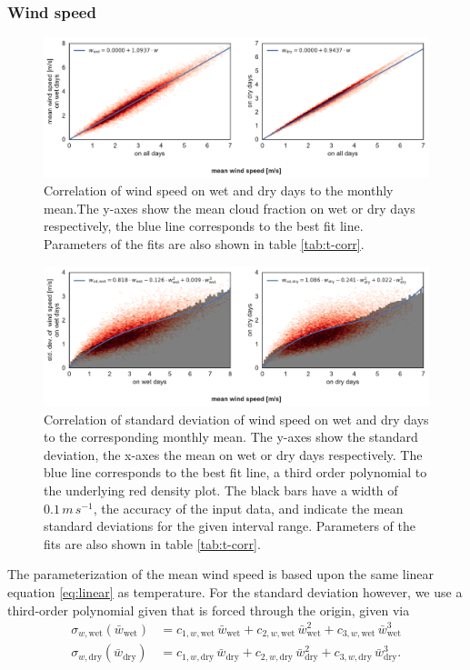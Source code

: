 \begin{refsection}
\subsubsection{Wind speed}
\begin{figure}
	\includegraphics[width=12cm]{gwgen-figures/f10.pdf}
	\caption[Correlation of wind speed on wet and dry days to the monthly mean]{Correlation of wind speed on wet and dry days to the monthly mean.The y-axes show the mean cloud fraction on wet or dry days respectively, the blue line corresponds to the best fit line. Parameters of the fits are also shown in table \ref{tab:t-corr}.}
	\label{fig:wind}
\end{figure}
\begin{figure}
	\includegraphics[width=12cm]{gwgen-figures/f11.pdf}
	\caption[Correlation of standard deviation of wind speed to the monthly mean]{Correlation of standard deviation of wind speed on wet and dry days to the corresponding monthly mean. The y-axes show the standard deviation, the x-axes the mean on wet or dry days respectively. The blue line corresponds to the best fit line, a third order polynomial to the underlying red density plot. The black bars have a width of $0.1\, \unit{m}\, \unit{s}^{-1}$, the accuracy of the input data, and indicate the mean standard deviations for the given interval range. Parameters of the fits are also shown in table \ref{tab:t-corr}.}
	\label{fig:wind_sd}
\end{figure}

The parameterization of the mean wind speed is based upon the same linear equation \eqref{eq:linear} as temperature. For the standard deviation however, we use a third-order polynomial given that is forced through the origin, given via
\begin{align}
\sigma_{w, \mathrm{wet}}(\bar{w}_{\mathrm{wet}}) &= c_{1, w, \mathrm{wet}}\, \bar{w}_{\mathrm{wet}} + c_{2, w, \mathrm{wet}}\, \bar{w}_{\mathrm{wet}}^2 + c_{3, w, \mathrm{wet}}\, \bar{w}_{\mathrm{wet}}^3 \nonumber \\
\sigma_{w, \mathrm{dry}}(\bar{w}_{\mathrm{dry}}) &= c_{1, w, \mathrm{dry}}\, \bar{w}_{\mathrm{dry}} + c_{2, w, \mathrm{dry}}\, \bar{w}_{\mathrm{dry}}^2 + c_{3, w, \mathrm{dry}}\, \bar{w}_{\mathrm{dry}}^3 \label{eq:sd_wind}.
\end{align}


\end{refsection}
